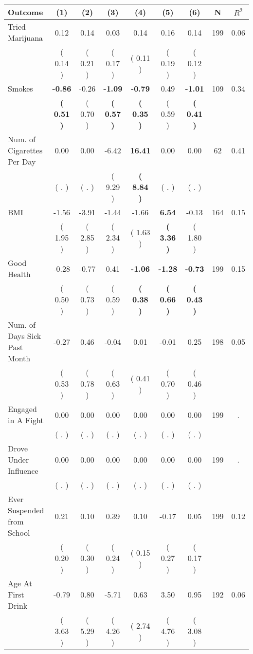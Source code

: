 \begin{tabular}{lcccccccc}
\toprule
 \textbf{Outcome} & \textbf{(1)} & \textbf{(2)} & \textbf{(3)} & \textbf{(4)} & \textbf{(5)} & \textbf{(6)} & \textbf{N} & \textbf{$ R^2$} \\
\midrule
Tried Marijuana &      0.12 &      0.14 &      0.03 &      0.14 &      0.16 &      0.14 & 199 &       0.06 \\ 
 & (     0.14 ) & (     0.21 ) & (     0.17 ) & (     0.11 ) & (     0.19 ) & (     0.12 ) & \\
Smokes & \textbf{    -0.86} &     -0.26 & \textbf{    -1.09} & \textbf{    -0.79} &      0.49 & \textbf{    -1.01} & 109 &       0.34 \\ 
 & \textbf{(     0.51 )} & (     0.70 ) & \textbf{(     0.57 )} & \textbf{(     0.35 )} & (     0.59 ) & \textbf{(     0.41 )} & \\
Num. of Cigarettes Per Day &      0.00 &      0.00 &     -6.42 & \textbf{    16.41} &      0.00 &      0.00 & 62 &       0.41 \\ 
 & (        . ) & (        . ) & (     9.29 ) & \textbf{(     8.84 )} & (        . ) & (        . ) & \\
BMI &     -1.56 &     -3.91 &     -1.44 &     -1.66 & \textbf{     6.54} &     -0.13 & 164 &       0.15 \\ 
 & (     1.95 ) & (     2.85 ) & (     2.34 ) & (     1.63 ) & \textbf{(     3.36 )} & (     1.80 ) & \\
Good Health &     -0.28 &     -0.77 &      0.41 & \textbf{    -1.06} & \textbf{    -1.28} & \textbf{    -0.73} & 199 &       0.15 \\ 
 & (     0.50 ) & (     0.73 ) & (     0.59 ) & \textbf{(     0.38 )} & \textbf{(     0.66 )} & \textbf{(     0.43 )} & \\
Num. of Days Sick Past Month &     -0.27 &      0.46 &     -0.04 &      0.01 &     -0.01 &      0.25 & 198 &       0.05 \\ 
 & (     0.53 ) & (     0.78 ) & (     0.63 ) & (     0.41 ) & (     0.70 ) & (     0.46 ) & \\
Engaged in A Fight &      0.00 &      0.00 &      0.00 &      0.00 &      0.00 &      0.00 & 199 &          . \\ 
 & (        . ) & (        . ) & (        . ) & (        . ) & (        . ) & (        . ) & \\
Drove Under Influence &      0.00 &      0.00 &      0.00 &      0.00 &      0.00 &      0.00 & 199 &          . \\ 
 & (        . ) & (        . ) & (        . ) & (        . ) & (        . ) & (        . ) & \\
Ever Suspended from School &      0.21 &      0.10 &      0.39 &      0.10 &     -0.17 &      0.05 & 199 &       0.12 \\ 
 & (     0.20 ) & (     0.30 ) & (     0.24 ) & (     0.15 ) & (     0.27 ) & (     0.17 ) & \\
Age At First Drink &     -0.79 &      0.80 &     -5.71 &      0.63 &      3.50 &      0.95 & 192 &       0.06 \\ 
 & (     3.63 ) & (     5.29 ) & (     4.26 ) & (     2.74 ) & (     4.76 ) & (     3.08 ) & \\
\bottomrule
\end{tabular}
